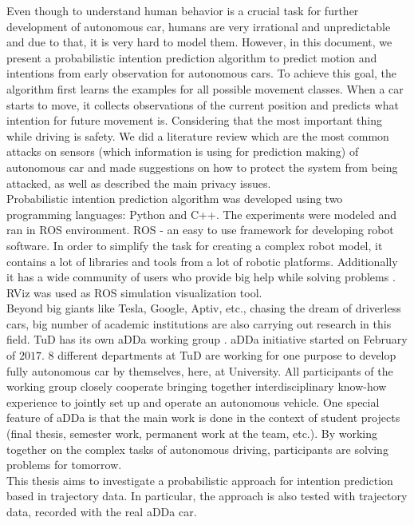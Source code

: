 Even though to understand human behavior is a crucial task for further development of autonomous car, humans are very irrational and unpredictable and due to that, it is very hard to model them. However, in this document, we present a probabilistic intention prediction algorithm to predict motion and intentions from early observation for autonomous cars. To achieve this goal, the algorithm first learns the examples for all possible movement classes. When a car starts to move, it collects observations of the current position and predicts what intention for future movement is. Considering that the most important thing while driving is safety. We did a literature review which are the most common attacks on sensors (which information is using for prediction making) of autonomous car and made suggestions on how to protect the system from being attacked, as well as described the main privacy issues. \\
Probabilistic intention prediction algorithm was developed using two programming languages: Python and C++. The experiments were modeled and ran in \gls{ROS} environment. \gls{ROS} - an easy to use framework for developing robot software. In order to simplify the task for creating a complex robot model, it contains a lot of libraries and tools from a lot of robotic platforms. Additionally it has a wide community of users who provide big help while solving problems \cite{aboutROS}. \gls{RViz} was used as \gls{ROS} simulation visualization tool. \\
Beyond big giants like Tesla, Google, Aptiv, etc., chasing the dream of driverless cars, big number of academic institutions are also carrying out research in this field. \gls{TuD} has its own \gls{aDDa} working group \cite{aDDa}. \gls{aDDa} initiative started on February of $2017$. $8$ different departments at \gls{TuD} are working for one purpose to develop fully autonomous car by themselves, here, at University. All participants of the working group closely cooperate bringing together interdisciplinary know-how experience to jointly set up and operate an autonomous vehicle. One special feature of \gls{aDDa} is that the main work is done in the context of student projects (final thesis, semester work, permanent work at the team, etc.). By working together on the complex tasks of autonomous driving, participants are solving problems for tomorrow. \\
This thesis aims to investigate a probabilistic approach for intention prediction based in trajectory data. In particular, the approach is also tested with trajectory data, recorded with the real \gls{aDDa} car.

